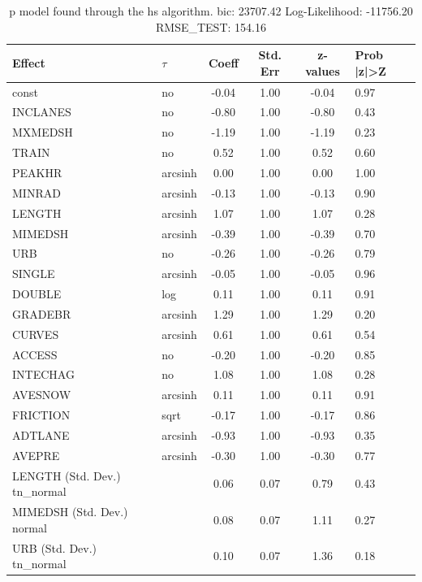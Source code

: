 \begin{table}
	\caption{p model found through the hs algorithm. bic: 23707.42 Log-Likelihood: -11756.20 RMSE_TEST: 154.16}
	\begin{center}
		\begin{tabular}{|l|l|c|c|c|l|}
			\hline
			Effect & $\tau$ & Coeff & Std. Err & z-values & Prob |z|>Z \\
			\hline
			const & no & -0.04 & 1.00 & -0.04 & 0.97 \\
			\hline
			INCLANES & no & -0.80 & 1.00 & -0.80 & 0.43 \\
			\hline
			MXMEDSH & no & -1.19 & 1.00 & -1.19 & 0.23 \\
			\hline
			TRAIN & no & 0.52 & 1.00 & 0.52 & 0.60 \\
			\hline
			PEAKHR & arcsinh & 0.00 & 1.00 & 0.00 & 1.00 \\
			\hline
			MINRAD & arcsinh & -0.13 & 1.00 & -0.13 & 0.90 \\
			\hline
			LENGTH & arcsinh & 1.07 & 1.00 & 1.07 & 0.28 \\
			\hline
			MIMEDSH & arcsinh & -0.39 & 1.00 & -0.39 & 0.70 \\
			\hline
			URB & no & -0.26 & 1.00 & -0.26 & 0.79 \\
			\hline
			SINGLE & arcsinh & -0.05 & 1.00 & -0.05 & 0.96 \\
			\hline
			DOUBLE & log & 0.11 & 1.00 & 0.11 & 0.91 \\
			\hline
			GRADEBR & arcsinh & 1.29 & 1.00 & 1.29 & 0.20 \\
			\hline
			CURVES & arcsinh & 0.61 & 1.00 & 0.61 & 0.54 \\
			\hline
			ACCESS & no & -0.20 & 1.00 & -0.20 & 0.85 \\
			\hline
			INTECHAG & no & 1.08 & 1.00 & 1.08 & 0.28 \\
			\hline
			AVESNOW & arcsinh & 0.11 & 1.00 & 0.11 & 0.91 \\
			\hline
			FRICTION & sqrt & -0.17 & 1.00 & -0.17 & 0.86 \\
			\hline
			ADTLANE & arcsinh & -0.93 & 1.00 & -0.93 & 0.35 \\
			\hline
			AVEPRE & arcsinh & -0.30 & 1.00 & -0.30 & 0.77 \\
			\hline
			LENGTH (Std. Dev.) tn_normal &  & 0.06 & 0.07 & 0.79 & 0.43 \\
			\hline
			MIMEDSH (Std. Dev.) normal &  & 0.08 & 0.07 & 1.11 & 0.27 \\
			\hline
			URB (Std. Dev.) tn_normal &  & 0.10 & 0.07 & 1.36 & 0.18 \\

\end{tabular}
\end{center}
\end{table}
